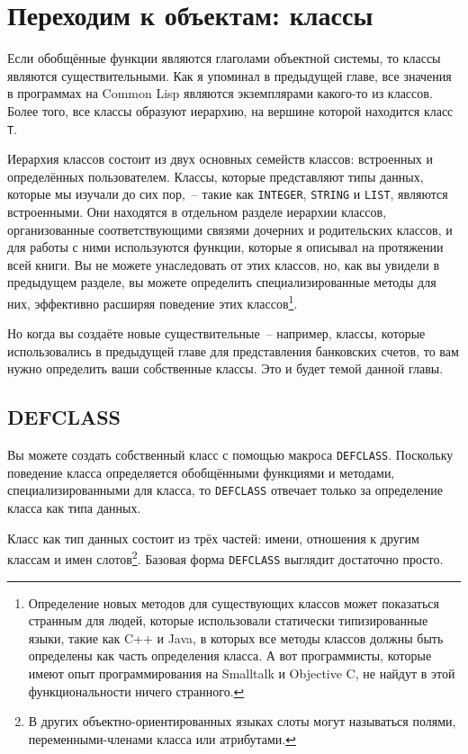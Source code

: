 \chapter{Переходим к объектам: классы}
\label{ch:17}

\thispagestyle{empty}

Если обобщённые функции являются глаголами объектной системы, то классы являются
существительными.  Как я упоминал в предыдущей главе, все значения в программах на Common
Lisp являются экземплярами какого-то из классов.  Более того, все классы образуют иерархию,
на вершине которой находится класс \lstinline{T}.

Иерархия классов состоит из двух основных семейств классов: встроенных и определённых
пользователем.  Классы, которые представляют типы данных, которые мы изучали до сих
пор,~-- такие как \lstinline{INTEGER}, \lstinline{STRING} и \lstinline{LIST}, являются встроенными.  Они
находятся в отдельном разделе иерархии классов, организованные соответствующими связями
дочерних и родительских классов, и для работы с ними используются функции, которые я
описывал на протяжении всей книги.  Вы не можете унаследовать от этих классов, но, как вы
увидели в предыдущем разделе, вы можете определить специализированные методы для них,
эффективно расширяя поведение этих классов\footnote{Определение новых методов для
    существующих классов может показаться странным для людей, которые использовали
    статически типизированные языки, такие как C++ и Java, в которых все методы классов
    должны быть определены как часть определения класса.  А вот программисты, которые
    имеют опыт программирования на Smalltalk и Objective C, не найдут в этой
функциональности ничего странного.}.

Но когда вы создаёте новые существительные~-- например, классы, которые использовались в
предыдущей главе для представления банковских счетов, то вам нужно определить ваши
собственные классы.  Это и будет темой данной главы.

\section{DEFCLASS}

Вы можете создать собственный класс с помощью макроса \lstinline{DEFCLASS}.  Поскольку
поведение класса определяется обобщёнными функциями и методами, специализированными для
класса, то \lstinline{DEFCLASS} отвечает только за определение класса как типа данных.

Класс как тип данных состоит из трёх частей: имени, отношения к другим классам и имен
слотов\footnote{В других объектно-ориентированных языках слоты могут называться полями,
переменными-членами класса или атрибутами.}.  Базовая форма \lstinline{DEFCLASS} выглядит
достаточно просто.

